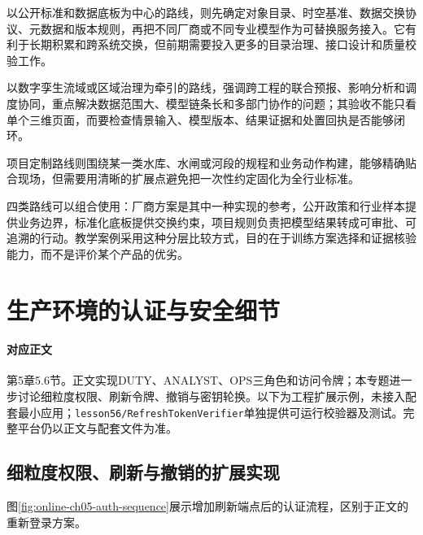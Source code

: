 以公开标准和数据底板为中心的路线，则先确定对象目录、时空基准、数据交换协议、元数据和版本规则，再把不同厂商或不同专业模型作为可替换服务接入。它有利于长期积累和跨系统交换，但前期需要投入更多的目录治理、接口设计和质量校验工作。

以数字孪生流域或区域治理为牵引的路线，强调跨工程的联合预报、影响分析和调度协同，重点解决数据范围大、模型链条长和多部门协作的问题；其验收不能只看单个三维页面，而要检查情景输入、模型版本、结果证据和处置回执是否能够闭环。

项目定制路线则围绕某一类水库、水闸或河段的规程和业务动作构建，能够精确贴合现场，但需要用清晰的扩展点避免把一次性约定固化为全行业标准。

四类路线可以组合使用：厂商方案是其中一种实现的参考，公开政策和行业样本提供业务边界，标准化底板提供交换约束，项目规则负责把模型结果转成可审批、可追溯的行动。教学案例采用这种分层比较方式，目的在于训练方案选择和证据核验能力，而不是评价某个产品的优劣。

\section{生产环境的认证与安全细节}\label{online:security}

\paragraph{对应正文}第5章5.6节。正文实现DUTY、ANALYST、OPS三角色和访问令牌；本专题进一步讨论细粒度权限、刷新令牌、撤销与密钥轮换。以下为工程扩展示例，未接入配套最小应用；\texttt{lesson56/RefreshTokenVerifier}单独提供可运行校验器及测试。完整平台仍以正文与配套文件为准。

\subsection{细粒度权限、刷新与撤销的扩展实现}

图\ref{fig:online-ch05-auth-sequence}展示增加刷新端点后的认证流程，区别于正文的重新登录方案。

